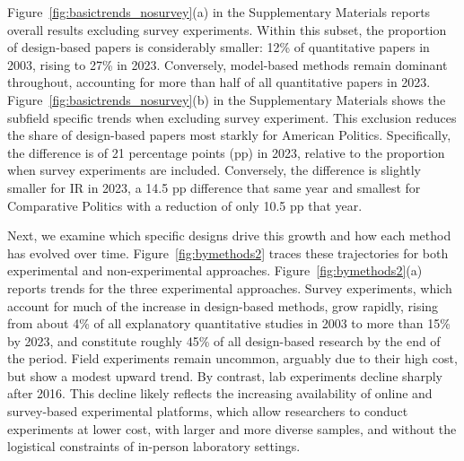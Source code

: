 \documentclass[12pt]{article}
\begin{document}
Figure~\ref{fig:basictrends_nosurvey}(a) in the Supplementary Materials  reports overall results excluding survey experiments. Within this subset, the proportion of design-based papers is considerably smaller: 12\% of quantitative papers in 2003, rising to 27\% in 2023. Conversely, model-based methods remain dominant throughout, accounting for more than half of all quantitative papers in 2023. Figure~\ref{fig:basictrends_nosurvey}(b) in the Supplementary Materials shows the subfield specific trends when excluding survey experiment. This exclusion reduces the share of design-based papers most starkly for American Politics. Specifically, the difference is of 21 percentage points (pp) in 2023, relative to the proportion when survey experiments are included. Conversely, the difference is slightly smaller for IR in 2023, a 14.5 pp difference that same year and smallest for Comparative Politics with a reduction of only 10.5 pp that year.


Next, we examine which specific designs drive this growth and how each method has evolved over time. Figure~\ref{fig:bymethods2} traces these trajectories for both experimental and non-experimental approaches. Figure~\ref{fig:bymethods2}(a) reports trends for the three experimental approaches. Survey experiments, which account for much of the increase in design-based methods, grow rapidly, rising from about 4\% of all explanatory quantitative studies in 2003 to more than 15\% by 2023, and constitute roughly 45\% of all design-based research by the end of the period. Field experiments remain uncommon, arguably due to their high cost, but show a modest upward trend. By contrast, lab experiments decline sharply after 2016. This decline likely reflects the increasing availability of online and survey-based experimental platforms, which allow researchers to conduct experiments at lower cost, with larger and more diverse samples, and without the logistical constraints of in-person laboratory settings.
\end{document}
